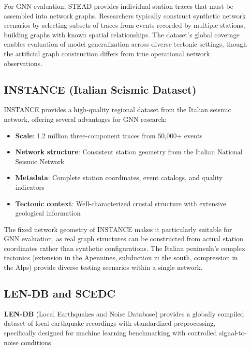 \documentclass[review,authoryear]{elsarticle}
\begin{document}
For GNN evaluation, STEAD provides individual station traces that must be assembled into network graphs. Researchers typically construct synthetic network scenarios by selecting subsets of traces from events recorded by multiple stations, building graphs with known spatial relationships. The dataset's global coverage enables evaluation of model generalization across diverse tectonic settings, though the artificial graph construction differs from true operational network observations.

\subsection{INSTANCE (Italian Seismic Dataset)}

INSTANCE \citep{michelini2021instance} provides a high-quality regional dataset from the Italian seismic network, offering several advantages for GNN research:

\begin{itemize}
  \item \textbf{Scale}: 1.2 million three-component traces from 50,000+ events
  \item \textbf{Network structure}: Consistent station geometry from the Italian National Seismic Network
  \item \textbf{Metadata}: Complete station coordinates, event catalogs, and quality indicators
  \item \textbf{Tectonic context}: Well-characterized crustal structure with extensive geological information
\end{itemize}

The fixed network geometry of INSTANCE makes it particularly suitable for GNN evaluation, as real graph structures can be constructed from actual station coordinates rather than synthetic configurations. The Italian peninsula's complex tectonics (extension in the Apennines, subduction in the south, compression in the Alps) provide diverse testing scenarios within a single network.

\subsection{LEN-DB and SCEDC}

\textbf{LEN-DB} (Local Earthquakes and Noise Database) \citep{magrini2020lendb} provides a globally compiled dataset of local earthquake recordings with standardized preprocessing, specifically designed for machine learning benchmarking with controlled signal-to-noise conditions.
\end{document}
